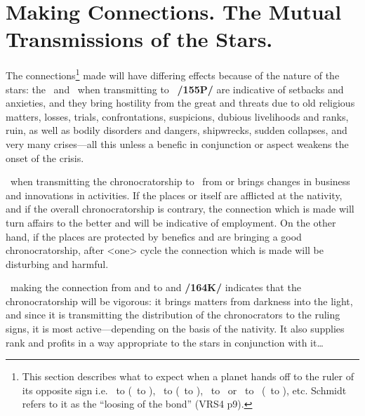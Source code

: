 \section{Making Connections. The Mutual Transmissions of the Stars.}
The connections\footnote{This section describes what to expect when a planet hands off to the ruler of its opposite sign i.e. \Leo\, to \Aquarius (\Sun\, to \Saturn), \Cancer\, to \Capricorn (\Moon\, to \Saturn), \Gemini\, to \Sagittarius\, or \Virgo\, to \Pisces\, (\Mercury\, to \Jupiter), etc. Schmidt refers to it as the ``loosing of the bond'' (VRS4 p9).} made will have differing effects because of the nature of the stars: the \Sun\, and \Moon\, when transmitting to \Saturn\, \textbf{/155P/} are indicative of setbacks and anxieties, and they bring hostility from the great and threats due to old religious matters, losses, trials, confrontations, suspicions, dubious livelihoods and ranks, ruin, as well as bodily disorders and dangers, shipwrecks, sudden collapses, and very many crises—all this unless a benefic in conjunction or aspect weakens the onset of the crisis.

\Mercury\, when transmitting the chronocratorship to \Jupiter\, from \Virgo\xspace or \Gemini\xspace brings changes in business and innovations in activities. If the places or \Mercury\xspace itself are afflicted at the nativity, and if the overall chronocratorship is contrary, the connection which is made will turn affairs to the better and will be
indicative of employment. On the other hand, if the places are protected by benefics and are bringing a good chronocratorship, after <one> cycle the connection which is made will be disturbing and harmful.

\Saturn\, making the connection from \Capricorn\xspace and \Aquarius\xspace to \Leo\xspace and \Cancer\xspace \textbf{/164K/} indicates that the chronocratorship will be vigorous: it brings matters from darkness into the light, and since it is
transmitting the distribution of the chronocrators to the ruling signs, it is most active—depending on the basis of the nativity. It also supplies rank and profits in a way appropriate to the stars in conjunction with it\ldots

\newpage